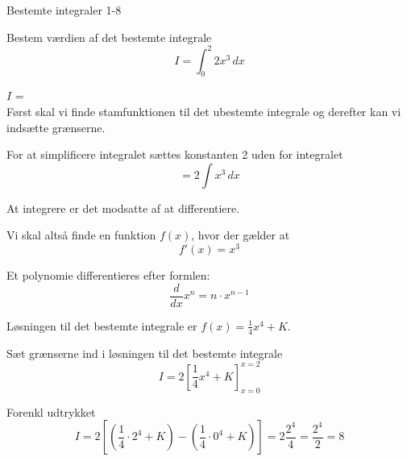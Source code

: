 \documentclass{article}
\begin{document}
\begin{exercise}{Bestemte integraler 1-8}
	
	Bestem værdien af det bestemte integrale
	\[
	I = \int_0^2 2x^3 \, dx
	\]
	
	$I$ =  \\
	
	
	\hint
	Først skal vi finde stamfunktionen til det ubestemte integrale og derefter kan vi indsætte grænserne.
	
	\hint
	For at simplificere integralet sættes konstanten 2 uden for integralet
	\[
	= 2 \int x^3 \, dx
	\]
	
	\hint
	At integrere er det modsatte af at differentiere.
	
	\hint
	Vi skal altså finde en funktion $f(x)$, hvor der gælder at
	\[
	f'(x) = x^3
	\]
	
	\hint
	Et polynomie differentieres efter formlen:
	\[
	\frac{d}{dx} x^n = n \cdot x^{n - 1}
	\]
	
	\hint
	Løsningen til det bestemte integrale er $f(x) = \frac{1}{4} x^4 + K$.
	
	\hint
	Sæt grænserne ind i løsningen til det bestemte integrale
	\[
	I = 2 \left[ \frac{1}{4} x^4 + K \right]_{x=0}^{x=2}
	\]
	
	\hint
	Forenkl udtrykket
	\[
	I =2 \left[ \left( \frac{1}{4} \cdot 2^4 + K \right) - \left( \frac{1}{4} \cdot 0^4 + K \right) \right] = 2 \frac{2^4}{4} = \frac{2^4}{2} = 8
	\]
	
	
\end{exercise}
\end{document}
